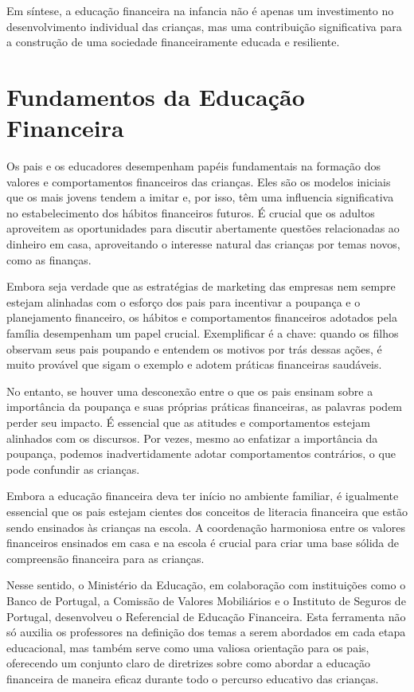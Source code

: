 \documentclass{report}
\begin{document}
Em síntese, a educação financeira na infancia não é apenas um investimento no desenvolvimento individual das crianças, mas uma contribuição significativa para a construção de uma sociedade financeiramente educada e resiliente.

\chapter{Fundamentos da Educação Financeira}
\label{chap:Fundamentos da Educação Financeira}

Os pais e os educadores desempenham papéis fundamentais na formação dos valores e comportamentos financeiros das crianças. Eles são os modelos iniciais que os mais jovens tendem a imitar e, por isso, têm uma influencia significativa no estabelecimento dos hábitos financeiros futuros. É crucial que os adultos aproveitem as oportunidades para discutir abertamente questões relacionadas ao dinheiro em casa, aproveitando o interesse natural das crianças por temas novos, como as finanças.

Embora seja verdade que as estratégias de marketing das empresas nem sempre estejam alinhadas com o esforço dos pais para incentivar a poupança e o planejamento financeiro, os hábitos e comportamentos financeiros adotados pela família desempenham um papel crucial. Exemplificar é a chave: quando os filhos observam seus pais poupando e entendem os motivos por trás dessas ações, é muito provável que sigam o exemplo e adotem práticas financeiras saudáveis.

No entanto, se houver uma desconexão entre o que os pais ensinam sobre a importância da poupança e suas próprias práticas financeiras, as palavras podem perder seu impacto. É essencial que as atitudes e comportamentos estejam alinhados com os discursos. Por vezes, mesmo ao enfatizar a importância da poupança, podemos inadvertidamente adotar comportamentos contrários, o que pode confundir as crianças.

Embora a educação financeira deva ter início no ambiente familiar, é igualmente essencial que os pais estejam cientes dos conceitos de literacia financeira que estão sendo ensinados às crianças na escola. A coordenação harmoniosa entre os valores financeiros ensinados em casa e na escola é crucial para criar uma base sólida de compreensão financeira para as crianças.

Nesse sentido, o Ministério da Educação, em colaboração com instituições como o Banco de Portugal, a Comissão de Valores Mobiliários e o Instituto de Seguros de Portugal, desenvolveu o Referencial de Educação Financeira. Esta ferramenta não só auxilia os professores na definição dos temas a serem abordados em cada etapa educacional, mas também serve como uma valiosa orientação para os pais, oferecendo um conjunto claro de diretrizes sobre como abordar a educação financeira de maneira eficaz durante todo o percurso educativo das crianças.
\end{document}
